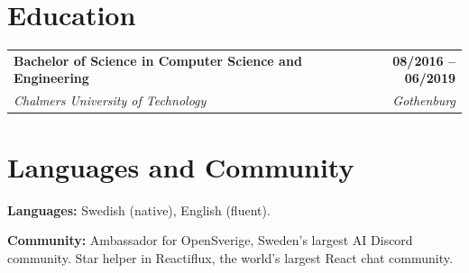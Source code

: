 \documentclass[a4paper,11pt]{article}
\makeatletter
\newcommand{\role}[4]{%
  \vspace{4pt}
  \begin{tabular*}{\textwidth}[t]{l@{\extracolsep{\fill}}r}
    \textbf{#1} & \textbf{\small #2} \\
    \textit{\small #3} & \textit{\small #4} \\
  \end{tabular*}\vspace{-2pt}}
\makeatother
\begin{document}
\section{Education}
\role{Bachelor of Science in Computer Science and Engineering}{08/2016 -- 06/2019}{Chalmers University of Technology}{Gothenburg}

\section{Languages and Community}
\small \textbf{Languages:} Swedish (native), English (fluent).\par\vspace{2pt}
\textbf{Community:} Ambassador for OpenSverige, Sweden's largest AI Discord community. Star helper in Reactiflux, the world's largest React chat community.
\end{document}
